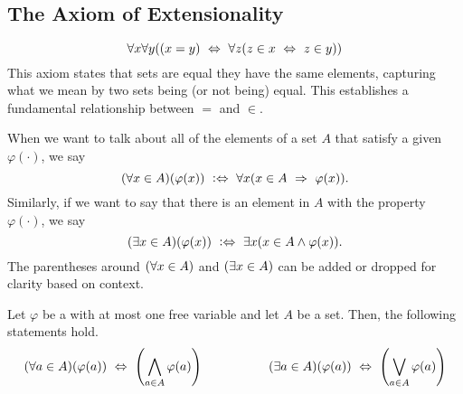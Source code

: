 \subsection{The Axiom of Extensionality}
\begin{axiom}[Extensionality]\label{ax:extensionality}
    \[
        \forall x \forall y \pn*{\pn*{x = y} \iff \forall z \pn*{z \in x \iff z \in y}}
    \]
    This axiom states that sets are equal \ifandonlyif they have the same elements,
    capturing what we mean by two sets being (or not being) equal.
    This establishes a fundamental relationship between \(=\) and \(\in\).
\end{axiom}

\begin{definition}
    When we want to talk about all of the elements of a set \(A\) that satisfy a given {\wff} \(\varphi(\cdot)\),
    we say
    \[
        \pn*{\forall x \in A}\pn*{\varphi(x)} \iffdefn \forall x \pn*{x \in A \implies \varphi(x)}.
    \]
    Similarly, if we want to say that there is an element in \(A\) with the property \(\varphi(\cdot)\),
    we say
    \[
        \pn*{\exists x \in A}\pn*{\varphi(x)} \iffdefn \exists x \pn*{x \in A \meet \varphi(x)}.
    \]
    The parentheses around \(\pn*{\forall x \in A}\) and \(\pn*{\exists x \in A}\)
    can be added or dropped for clarity based on context.
\end{definition}

\begin{theorem}
    Let \(\varphi\) be a {\wff} with at most one free variable and let \(A\) be a set.
    Then, the following statements hold.
    \[
        \pn*{\forall a \in A}\pn*{\varphi(a)} \iff \pn*{\bigmeet_{a \in A}\varphi(a)}
        ~~~~~~~~~~~~~~~~
        \pn*{\exists a \in A}\pn*{\varphi(a)} \iff \pn*{\bigjoin_{a \in A}\varphi(a)}
    \]
\end{theorem}
% 


